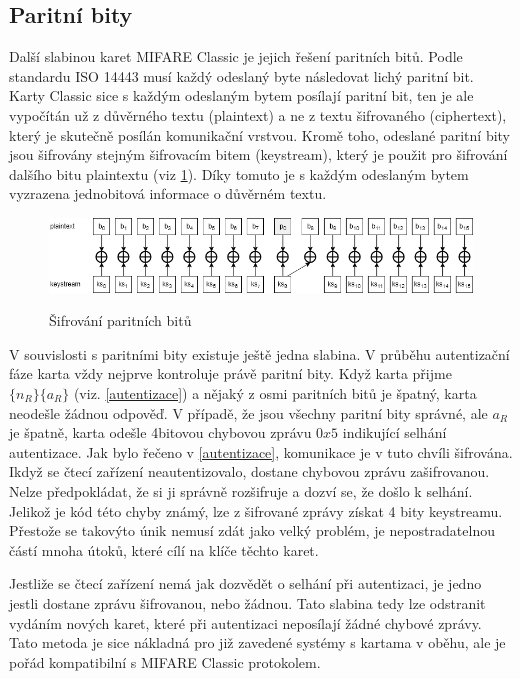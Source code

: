 \subsection{Paritní bity}
Další slabinou karet MIFARE Classic je jejich řešení paritních bitů. Podle standardu ISO 14443 musí každý odeslaný byte následovat lichý paritní bit. Karty Classic sice s každým odeslaným bytem posílají paritní bit, ten je ale vypočítán už z důvěrného textu (plaintext) a ne z textu šifrovaného (ciphertext), který je skutečně posílán komunikační vrstvou. Kromě toho, odeslané paritní bity jsou šifrovány stejným šifrovacím bitem (keystream), který je použit pro šifrování dalšího bitu plaintextu (viz \ref{parityDiagram})\cite{Cryptanalisis}.
Díky tomuto je s každým odeslaným bytem vyzrazena jednobitová informace o důvěrném textu\cite{Dismantling_Mifare_Classic}. 
\begin{figure}[ht]\centering
  \centering
  \hspace*{-0.08\linewidth}
  \includegraphics[width=\linewidth]{obrazky-figures/parityBits.png}\\[1pt]  
  \caption{Šifrování paritních bitů \cite{Cryptanalisis}}   
  \label{parityDiagram}
\end{figure}
\par
V souvislosti s paritními bity existuje ještě jedna slabina. V průběhu autentizační fáze karta vždy nejprve kontroluje právě paritní bity. Když karta přijme $\{n_R\}\{a_R\}$ (viz. \ref{autentizace}) a nějaký z osmi paritních bitů je špatný, karta neodešle žádnou odpověď. V případě, že jsou všechny paritní bity správné, ale $a_R$ je špatně, karta odešle 4bitovou chybovou zprávu $0x5$ indikující selhání autentizace. Jak bylo řečeno v \ref{autentizace}, komunikace je v tuto chvíli šifrována. Ikdyž se čtecí zařízení neautentizovalo, dostane chybovou zprávu zašifrovanou. Nelze předpokládat, že si ji správně rozšifruje a dozví se, že došlo k selhání.
Jelikož je kód této chyby známý, lze z šifrované zprávy získat 4 bity keystreamu. Přestože se takovýto únik nemusí zdát jako velký problém, je nepostradatelnou částí mnoha útoků, které cílí na klíče těchto karet.
\par
Jestliže se čtecí zařízení nemá jak dozvědět o selhání při autentizaci, je jedno jestli dostane zprávu šifrovanou, nebo žádnou. Tato slabina tedy lze odstranit vydáním nových karet, které při autentizaci neposílají žádné chybové zprávy. Tato metoda je sice nákladná pro již zavedené systémy s kartama v oběhu, ale je pořád kompatibilní s MIFARE Classic protokolem\cite{Cryptanalisis}. 

